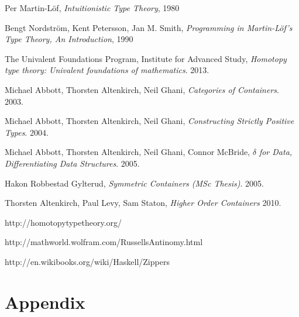 \documentclass[12pt]{report}
\begin{document}
\begin{thebibliography}{10}

  Per Martin-L\"of,
  \emph{Intuitionistic Type Theory},
  1980

  Bengt Nordstr\"om, Kent Petersson, Jan M. Smith,
  \emph{Programming in Martin-L\"of's Type Theory, An Introduction},
  1990

  The Univalent Foundations Program, Institute for Advanced Study,
  \emph{Homotopy type theory: Univalent foundations of mathematics}.
  2013.

  Michael Abbott, Thorsten Altenkirch, Neil Ghani,
  \emph{Categories of Containers}.
  2003.

  Michael Abbott, Thorsten Altenkirch, Neil Ghani,
  \emph{Constructing Strictly Positive Types}.
  2004.
  
  Michael Abbott, Thorsten Altenkirch, Neil Ghani, Connor McBride,
  \emph{$\delta$ for Data, Differentiating Data Structures}.
  2005.

  Hakon Robbestad Gylterud,
  \emph{Symmetric Containers (MSc Thesis)}.
  2005.
  
  Thorsten Altenkirch, Paul Levy, Sam Staton,
  \emph{Higher Order Containers}
  2010.
  
  http://homotopytypetheory.org/
  
  http://mathworld.wolfram.com/RussellsAntinomy.html
  
  http://en.wikibooks.org/wiki/Haskell/Zippers

\end{thebibliography}
\cleardoublepage
{}
{}

\chapter{Appendix}
\end{document}
